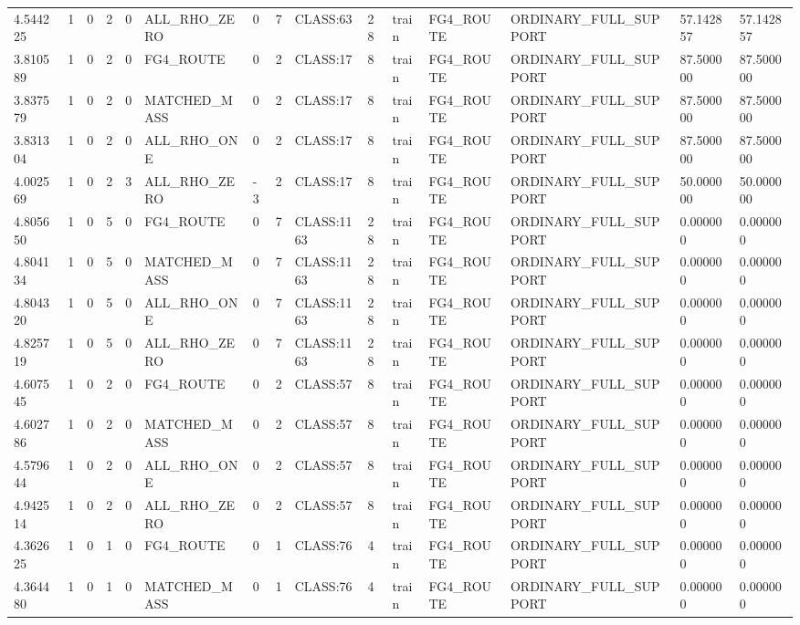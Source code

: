 \begin{tabular}{lllllllllllllll}
4.544225 & 1 & 0 & 2 & 0 & ALL\_RHO\_ZERO & 0 & 7 & CLASS:63 & 28 & train & FG4\_ROUTE & ORDINARY\_FULL\_SUPPORT & 57.142857 & 57.142857 \\
3.810589 & 1 & 0 & 2 & 0 & FG4\_ROUTE & 0 & 2 & CLASS:17 & 8 & train & FG4\_ROUTE & ORDINARY\_FULL\_SUPPORT & 87.500000 & 87.500000 \\
3.837579 & 1 & 0 & 2 & 0 & MATCHED\_MASS & 0 & 2 & CLASS:17 & 8 & train & FG4\_ROUTE & ORDINARY\_FULL\_SUPPORT & 87.500000 & 87.500000 \\
3.831304 & 1 & 0 & 2 & 0 & ALL\_RHO\_ONE & 0 & 2 & CLASS:17 & 8 & train & FG4\_ROUTE & ORDINARY\_FULL\_SUPPORT & 87.500000 & 87.500000 \\
4.002569 & 1 & 0 & 2 & 3 & ALL\_RHO\_ZERO & -3 & 2 & CLASS:17 & 8 & train & FG4\_ROUTE & ORDINARY\_FULL\_SUPPORT & 50.000000 & 50.000000 \\
4.805650 & 1 & 0 & 5 & 0 & FG4\_ROUTE & 0 & 7 & CLASS:1163 & 28 & train & FG4\_ROUTE & ORDINARY\_FULL\_SUPPORT & 0.000000 & 0.000000 \\
4.804134 & 1 & 0 & 5 & 0 & MATCHED\_MASS & 0 & 7 & CLASS:1163 & 28 & train & FG4\_ROUTE & ORDINARY\_FULL\_SUPPORT & 0.000000 & 0.000000 \\
4.804320 & 1 & 0 & 5 & 0 & ALL\_RHO\_ONE & 0 & 7 & CLASS:1163 & 28 & train & FG4\_ROUTE & ORDINARY\_FULL\_SUPPORT & 0.000000 & 0.000000 \\
4.825719 & 1 & 0 & 5 & 0 & ALL\_RHO\_ZERO & 0 & 7 & CLASS:1163 & 28 & train & FG4\_ROUTE & ORDINARY\_FULL\_SUPPORT & 0.000000 & 0.000000 \\
4.607545 & 1 & 0 & 2 & 0 & FG4\_ROUTE & 0 & 2 & CLASS:57 & 8 & train & FG4\_ROUTE & ORDINARY\_FULL\_SUPPORT & 0.000000 & 0.000000 \\
4.602786 & 1 & 0 & 2 & 0 & MATCHED\_MASS & 0 & 2 & CLASS:57 & 8 & train & FG4\_ROUTE & ORDINARY\_FULL\_SUPPORT & 0.000000 & 0.000000 \\
4.579644 & 1 & 0 & 2 & 0 & ALL\_RHO\_ONE & 0 & 2 & CLASS:57 & 8 & train & FG4\_ROUTE & ORDINARY\_FULL\_SUPPORT & 0.000000 & 0.000000 \\
4.942514 & 1 & 0 & 2 & 0 & ALL\_RHO\_ZERO & 0 & 2 & CLASS:57 & 8 & train & FG4\_ROUTE & ORDINARY\_FULL\_SUPPORT & 0.000000 & 0.000000 \\
4.362625 & 1 & 0 & 1 & 0 & FG4\_ROUTE & 0 & 1 & CLASS:76 & 4 & train & FG4\_ROUTE & ORDINARY\_FULL\_SUPPORT & 0.000000 & 0.000000 \\
4.364480 & 1 & 0 & 1 & 0 & MATCHED\_MASS & 0 & 1 & CLASS:76 & 4 & train & FG4\_ROUTE & ORDINARY\_FULL\_SUPPORT & 0.000000 & 0.000000 \\

\end{tabular}
